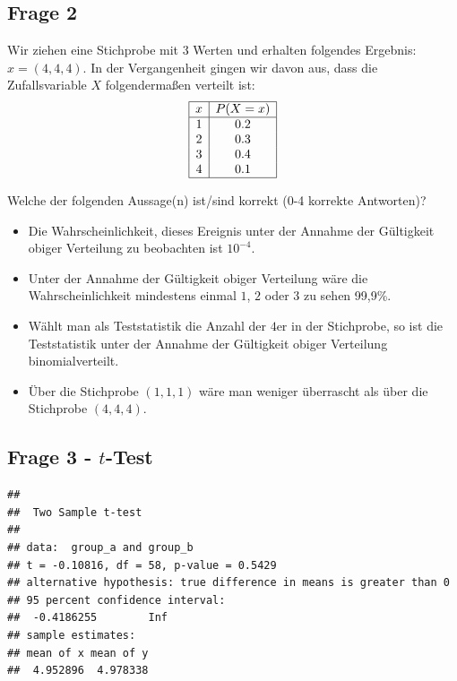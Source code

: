 \documentclass[
]{book}
\providecommand{\tightlist}{%
  \setlength{\itemsep}{0pt}\setlength{\parskip}{0pt}}
\begin{document}
\subsection{Frage 2}\label{frage-2-1}

Wir ziehen eine Stichprobe mit 3 Werten und erhalten folgendes Ergebnis: \(x = (4,4,4)\).
In der Vergangenheit gingen wir davon aus, dass die Zufallsvariable \(X\) folgendermaßen verteilt ist:
\[
\begin{array}{|c|c|}
\hline
x & P(X = x) \\
\hline
1 & 0.2 \\
2 & 0.3 \\
3 & 0.4 \\
4 & 0.1 \\
\hline
\end{array}
\]

Welche der folgenden Aussage(n) ist/sind korrekt (0-4 korrekte Antworten)?

\begin{itemize}
\tightlist
\item
  Die Wahrscheinlichkeit, dieses Ereignis unter der Annahme der Gültigkeit obiger Verteilung zu beobachten
  ist \(10^{-4}\).
\item
  Unter der Annahme der Gültigkeit obiger Verteilung wäre die Wahrscheinlichkeit mindestens einmal
  \(1\), \(2\) oder \(3\) zu sehen 99,9\%.
\item
  Wählt man als Teststatistik die Anzahl der \(4\)er in der Stichprobe, so ist die Teststatistik
  unter der Annahme der Gültigkeit obiger Verteilung binomialverteilt.
\item
  Über die Stichprobe \((1,1,1)\) wäre man weniger überrascht als über die Stichprobe \((4,4,4)\).
\end{itemize}

\subsection{\texorpdfstring{Frage 3 - \(t\)-Test}{Frage 3 - t-Test}}\label{frage-3---t-test}

\begin{verbatim}
## 
##  Two Sample t-test
## 
## data:  group_a and group_b
## t = -0.10816, df = 58, p-value = 0.5429
## alternative hypothesis: true difference in means is greater than 0
## 95 percent confidence interval:
##  -0.4186255        Inf
## sample estimates:
## mean of x mean of y 
##  4.952896  4.978338
\end{verbatim}
\end{document}
